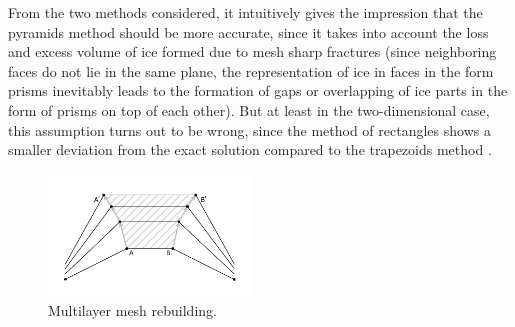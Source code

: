 \documentclass[
11pt,%
tightenlines,%
twoside,%
onecolumn,%
nofloats,%
nobibnotes,%
nofootinbib,%
superscriptaddress,%
noshowpacs,%
centertags]%
{revtex4-2}
\begin{document}
From the two methods considered, it intuitively gives the impression that the pyramids method should be more accurate, since it takes into account the loss and excess volume of ice formed due to mesh sharp fractures (since neighboring faces do not lie in the same plane, the representation of ice in faces in the form prisms inevitably leads to the formation of gaps or overlapping of ice parts in the form of prisms on top of each other).
But at least in the two-dimensional case, this assumption turns out to be wrong, since the method of rectangles shows a smaller deviation from the exact solution compared to the trapezoids method \cite{Rybakov_2D}.

\begin{figure}[h]
\includegraphics[width=0.48\textwidth]{pics/pic_classical_methods_multilayer_size.pdf}
\caption{Multilayer mesh rebuilding.}\label{fig:pic_classical_methods_multilayer}
\end{figure}
\end{document}
